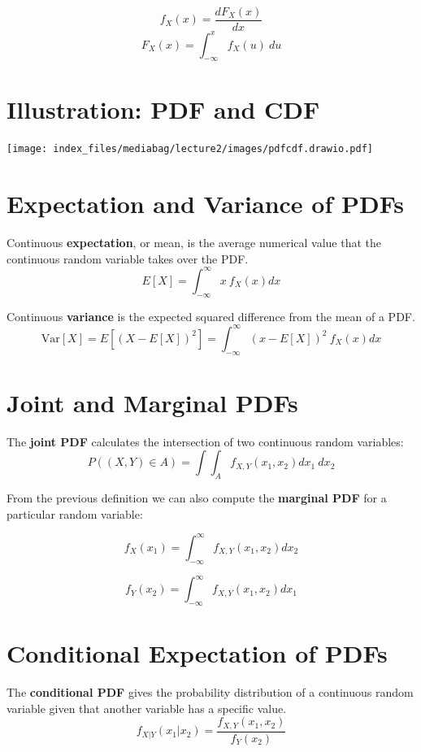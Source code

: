 \documentclass[
  letterpaper,
  DIV=11,
  numbers=noendperiod]{scrreprt}
\begin{document}
\[
f_{X}(x) = \frac{dF_{X}(x)}{dx}
\] \[
F_{X}(x) = \int_{-\infty}^{x} f_{X}(u) \ du
\]

\section{Illustration: PDF and CDF}\label{illustration-pdf-and-cdf}

\texttt{[image: index\_files/mediabag/lecture2/images/pdfcdf.drawio.pdf]}

\section{Expectation and Variance of
PDFs}\label{expectation-and-variance-of-pdfs}

Continuous \textbf{expectation}, or mean, is the average numerical value
that the continuous random variable takes over the PDF. \[ 
E[X] = \int_{-\infty}^{\infty} x \ f_{X}(x) dx 
\]

Continuous \textbf{variance} is the expected squared difference from the
mean of a PDF. \[ 
\text{Var}[X] = E[(X - E[X])^{2}] = \int_{-\infty}^{\infty} (x - E[X])^2 \ f_{X}(x) dx 
\]

\section{Joint and Marginal PDFs}\label{joint-and-marginal-pdfs}

The \textbf{joint PDF} calculates the intersection of two continuous
random variables: \[ 
P((X,Y) \in A) = \int \int_{A} f_{X,Y}(x_{1}, x_{2}) dx_{1} \ dx_{2} 
\]

From the previous definition we can also compute the \textbf{marginal
PDF} for a particular random variable:

\[
f_{X}(x_{1}) = \int_{-\infty}^{\infty} f_{X,Y}(x_{1}, x_{2}) dx_{2}
\]

\[
f_{Y}(x_{2}) = \int_{-\infty}^{\infty} f_{X,Y}(x_{1},x_{2}) dx_{1}
\]

\section{Conditional Expectation of
PDFs}\label{conditional-expectation-of-pdfs}

The \textbf{conditional PDF} gives the probability distribution of a
continuous random variable given that another variable has a specific
value. \[ 
f_{X|Y}(x_{1}| x_{2}) = \frac{f_{X,Y}(x_{1}, x_{2})}{f_{Y}(x_{2})} 
\]
\end{document}
